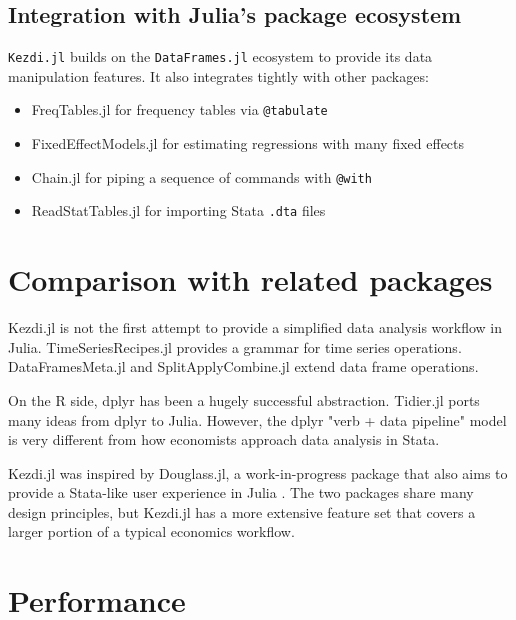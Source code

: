 \documentclass{juliacon}
\begin{document}
\subsection{Integration with Julia's package ecosystem}

\texttt{Kezdi.jl} builds on the \texttt{DataFrames.jl} ecosystem \cite{DataFrame.jl2023} to provide its data manipulation features. It also integrates tightly with other packages:

\begin{itemize}
	\item FreqTables.jl \cite{FreqTables.jl2023} for frequency tables via \texttt{@tabulate}
	\item FixedEffectModels.jl \cite{FixedEffectModels.jl2023} for estimating regressions with many fixed effects
	\item Chain.jl for piping a sequence of commands with \texttt{@with}
	\item ReadStatTables.jl for importing Stata \texttt{.dta} files
\end{itemize}

\section{Comparison with related packages}

Kezdi.jl is not the first attempt to provide a simplified data analysis workflow in Julia. TimeSeriesRecipes.jl \cite{TimeSeriesRecipes2022} provides a grammar for time series operations. DataFramesMeta.jl \cite{DataFramesMeta} and SplitApplyCombine.jl \cite{SplitApplyCombine2023} extend data frame operations.

On the R side, dplyr \cite{dplyr2023} has been a hugely successful abstraction. Tidier.jl \cite{tidier2022} ports many ideas from dplyr to Julia. However, the dplyr "verb + data pipeline" model is very different from how economists approach data analysis in Stata.

Kezdi.jl was inspired by Douglass.jl, a work-in-progress package that also aims to provide a Stata-like user experience in Julia \cite{Douglass.jl2023}. The two packages share many design principles, but Kezdi.jl has a more extensive feature set that covers a larger portion of a typical economics workflow.

\section{Performance}
\end{document}

